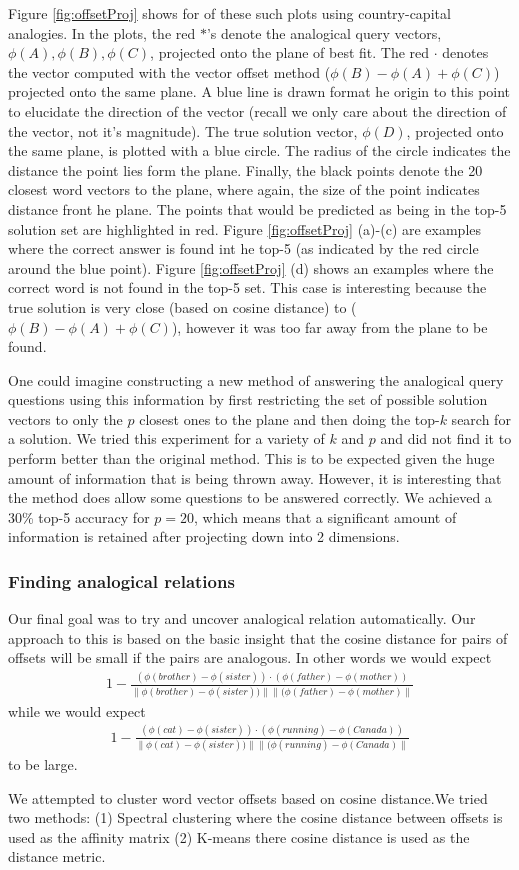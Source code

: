 Figure \ref{fig:offsetProj} shows for of these such plots using country-capital analogies. In the plots, the red $*$'s denote the analogical query vectors, $\phi(A), \phi(B), \phi(C)$, projected onto the plane of best fit. The red $\cdot$ denotes the vector computed with the vector offset method ($\phi(B) - \phi(A) + \phi(C)$) projected onto the same plane. A blue line is drawn format he origin to this point to elucidate the direction of the vector (recall we only care about the direction of the vector, not it's magnitude). The true solution vector, $\phi(D)$, projected onto the same plane, is plotted with a blue circle. The radius of the circle indicates the distance the point lies form the plane. Finally, the black points denote the 20 closest word vectors to the plane, where again, the size of the point indicates distance front he plane. The points that would be predicted as being in the top-5 solution set are highlighted in red. Figure \ref{fig:offsetProj} (a)-(c) are examples where the correct answer is found int he top-5 (as indicated by the red circle around the blue point). Figure \ref{fig:offsetProj} (d) shows an examples where the correct word is not found in the top-5 set. This case is interesting because the true solution is very close (based on cosine distance) to ($\phi(B) - \phi(A) + \phi(C)$), however it was too far away from the plane to be found. 

One could imagine constructing a new method of answering the analogical query questions using this information by first restricting the set of possible solution vectors to only the $p$ closest ones to the plane and then doing the top-$k$ search for a solution. We tried this experiment for a variety of $k$ and $p$ and did not find it to perform better than the original method. This is to be expected given the huge amount of information that is being thrown away. However, it is interesting that the method does allow some questions to be answered correctly. We achieved a 30\% top-5 accuracy for $p = 20$, which means that a significant amount of information is retained after projecting down into 2 dimensions.  

\subsubsection{Finding analogical relations}

Our final goal was to try and uncover analogical relation automatically. Our approach to this is based on the basic insight that the cosine distance for pairs of offsets will be small if the pairs are analogous. In other words we would expect 
\begin{align*}1 - \frac{(\phi(brother) - \phi(sister)) \cdot (\phi(father) - \phi(mother))}{ \| \phi(brother) - \phi(sister)) \| \| (\phi(father) - \phi(mother)\|}\end{align*}
while we would expect 
 \begin{align*}1 - \frac{(\phi(cat) - \phi(sister)) \cdot (\phi(running) - \phi(Canada))}{ \| \phi(cat) - \phi(sister)) \| \| (\phi(running) - \phi(Canada)\|}\end{align*} 
 to be large. 

We attempted to cluster word vector offsets based on cosine distance.We tried two methods: (1) Spectral clustering where the cosine distance between offsets is used as the affinity matrix (2) K-means there cosine distance is used as the distance metric. 